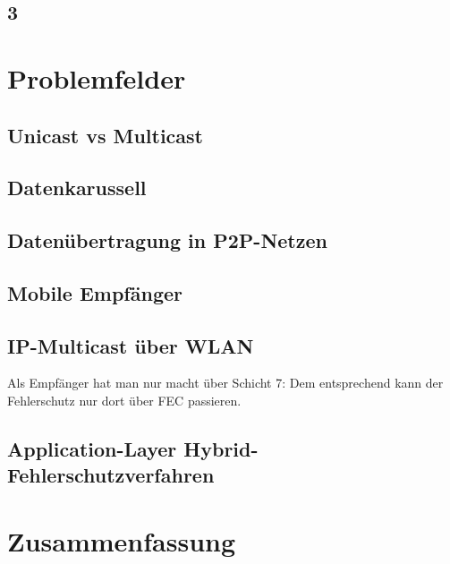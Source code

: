 \subsection{3}

\section{Problemfelder}
\subsection{Unicast vs Multicast}
\subsection{Datenkarussell}
\subsection{Datenübertragung in P2P-Netzen}
\subsection{Mobile Empfänger}
\subsection{IP-Multicast über WLAN}
Als Empfänger hat man nur macht über Schicht 7: Dem entsprechend kann der Fehlerschutz nur dort über FEC passieren.
\subsection{Application-Layer Hybrid-Fehlerschutzverfahren}

\section{Zusammenfassung}


